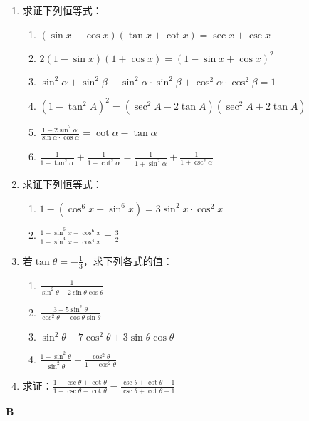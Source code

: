 \begin{enumerate}
    \item 求证下列恒等式：
\begin{enumerate}[(1)]
    \item $(\sin x+\cos x)(\tan x+\cot x)=\sec x+\csc x$
    \item $2(1-\sin x)(1+\cos x)=(1-\sin x+\cos x)^2$
    \item $\sin^2\alpha+\sin^2\beta-\sin^2\alpha\cdot \sin^2\beta+\cos^2\alpha\cdot \cos^2\beta=1$
    \item $(1-\tan^2 A)^2=(\sec^2 A-2\tan A)(\sec^2 A+2\tan A)$
    \item $\frac{1-2\sin^2\alpha}{\sin\alpha\cdot \cos\alpha}=\cot\alpha-\tan\alpha$
    \item $\frac{1}{1+\tan^2\alpha}+\frac{1}{1+\cot^2\alpha}=\frac{1}{1+\sin^2\alpha}+\frac{1}{1+\csc^2\alpha}$
\end{enumerate}

    \item 求证下列恒等式：
\begin{enumerate}[(1)]
    \item $1-(\cos^6 x+\sin^6 x)=3\sin^2x\cdot \cos^2 x$
    \item $\frac{1-\sin^6x-\cos^6x}{1-\sin^4x-\cos^4x}=\frac{3}{2}$
\end{enumerate}

\item 若$\tan\theta=-\frac{1}{3}$，求下列各式的值：
\begin{multicols}{2}
\begin{enumerate}[(1)]
    \item $\frac{1}{\sin^2\theta-2\sin\theta\cos\theta}$
    \item $\frac{3-5\sin^2\theta}{\cos^2\theta-\cos\theta\sin\theta}$
    \item $\sin^2\theta-7\cos^2\theta+3\sin\theta\cos\theta$
    \item $\frac{1+\sin^2\theta}{\sin^2\theta}+\frac{\cos^2\theta}{1-\cos^2\theta}$
\end{enumerate}
\end{multicols}

\item 求证：$\frac{1-\csc\theta+\cot\theta}{1+\csc\theta-\cot\theta}=\frac{\csc\theta+\cot\theta-1}{\csc\theta+\cot\theta+1}$
\end{enumerate}

\begin{center}
    \bfseries B
\end{center}

